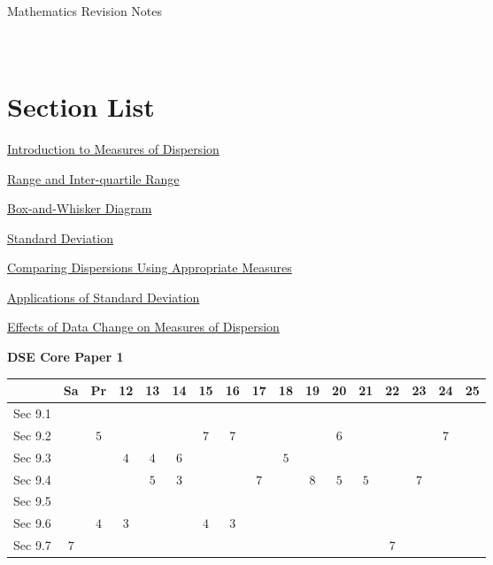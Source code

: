 \documentclass[12pt, a4paper]{article}
\begin{document}
\newpage
\newpage
\thispagestyle{empty}
\begin{center}
Mathematics Revision Notes\\\vspace{1cm}
\\\vspace{1cm}
{\fontsize{24pt}{24pt}\selectfont {Measures of Dispersion}} \\\vspace{1cm}
\label{chapter:S5-9}

\end{center}
\vspace{0.5cm}
\hline
\section*{Section List}
\begin{enumx}[label=Sec 9.\arabic*\ ]
\item \hyperref[section:5-9-1]{Introduction to Measures of Dispersion}
\item \hyperref[section:5-9-2]{Range and Inter-quartile Range}
\item \hyperref[section:5-9-3]{Box-and-Whisker Diagram}
\item \hyperref[section:5-9-4]{Standard Deviation}
\item \hyperref[section:5-9-5]{Comparing Dispersions Using Appropriate Measures}
\item \hyperref[section:5-9-6]{Applications of Standard  Deviation \NF}
\item \hyperref[section:5-9-7]{Effects of Data Change on  Measures of Dispersion \NF}
\end{enumx}
\begin{absolutelynopagebreak}
\begin{center}
\textbf{DSE Core Paper 1}
\end{center}
\begin{center}
\begin{tabular}{|l|c|c|c|c|c|c|c|c|c|c|c|c|c|c|c|c|}
\hline
        & Sa & Pr & 12 & 13 & 14 & 15 & 16 & 17 & 18 & 19 & 20 & 21 & 22 & 23 & 24 & 25 \\\hline\hline
Sec 9.1 &  &  &  &  &  &  &  &  &  &  &  &  &  &  &  &  \\\hline
Sec 9.2 &  &  $5$ &  &  &  &  $7$ &  $7$ &  &  &  &  $6$ &  &  &  &  $7$ &  \\\hline
Sec 9.3 &  &  &  $4$ &  $4$ &  $6$ &  &  &  &  $5$ &  &  &  &  &  &  &  \\\hline
Sec 9.4 &  &  &  &  $5$ &  $3$ &  &  &  $7$ &  &  $8$ &  $5$ &  $5$ &  &  $7$ &  &  \\\hline
Sec 9.5 &  &  &  &  &  &  &  &  &  &  &  &  &  &  &  &  \\\hline
Sec 9.6 &  &  $4$ &  $3$ &  &  &  $4$ &  $3$ &  &  &  &  &  &  &  &  &  \\\hline
Sec 9.7 &  $7$ &  &  &  &  &  &  &  &  &  &  &  &  $7$ &  &  &  \\\hline
\end{tabular}
\end{center}
\end{absolutelynopagebreak}
\end{document}
